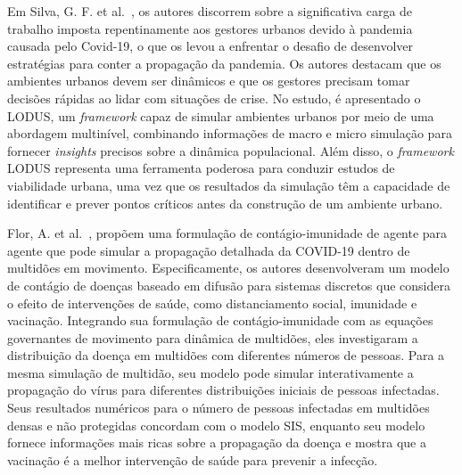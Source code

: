Em Silva, G. F. et al.~\cite{9239083}, os autores discorrem sobre a significativa carga de trabalho imposta repentinamente aos gestores urbanos devido à pandemia causada pelo Covid-19, o que os levou a enfrentar o desafio de desenvolver estratégias para conter a propagação da pandemia. Os autores destacam que os ambientes urbanos devem ser dinâmicos e que os gestores precisam tomar decisões rápidas ao lidar com situações de crise. No estudo, é apresentado o LODUS, um \textit{framework} capaz de simular ambientes urbanos por meio de uma abordagem multinível, combinando informações de macro e micro simulação para fornecer \textit{insights} precisos sobre a dinâmica populacional. Além disso, o \textit{framework} LODUS representa uma ferramenta poderosa para conduzir estudos de viabilidade urbana, uma vez que os resultados da simulação têm a capacidade de identificar e prever pontos críticos antes da construção de um ambiente urbano.

Flor, A. et al.~\cite{10.1145/3487983.3488298}, propõem uma formulação de contágio-imunidade de agente para agente que pode simular a propagação detalhada da COVID-19 dentro de multidões em movimento. Especificamente, os autores desenvolveram um modelo de contágio de doenças baseado em difusão para sistemas discretos que considera o efeito de intervenções de saúde, como distanciamento social, imunidade e vacinação. Integrando sua formulação de contágio-imunidade com as equações governantes de movimento para dinâmica de multidões, eles investigaram a distribuição da doença em multidões com diferentes números de pessoas. Para a mesma simulação de multidão, seu modelo pode simular interativamente a propagação do vírus para diferentes distribuições iniciais de pessoas infectadas. Seus resultados numéricos para o número de pessoas infectadas em multidões densas e não protegidas concordam com o modelo SIS, enquanto seu modelo fornece informações mais ricas sobre a propagação da doença e mostra que a vacinação é a melhor intervenção de saúde para prevenir a infecção.

